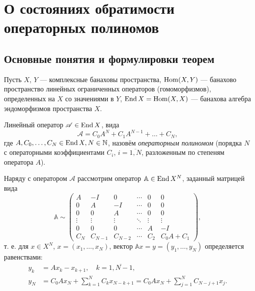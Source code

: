 \intro

\chapter{О состояниях обратимости операторных полиномов}
\section{Основные понятия и формулировки теорем}
Пусть $X$, $Y$ --- комплексные банаховы пространства, $\operatorname{Hom}(X, Y)$ --- банахово пространство линейных ограниченных операторов (гомоморфизмов), определенных на $X$ со значениями в $Y$, $\operatorname{End} X = \operatorname{Hom}(X, X)$ --- банахова алгебра эндоморфизмов пространства $X$.

Линейный оператор $ \mathcal A \in \operatorname{End} X$, вида
\[  \mathcal A = C_0 A^N + C_1 A^{N - 1} + \dotsc + C_N, \]
где $A, C_0, \dotsc, C_N \in \operatorname{End} X, N \in \mathbb{N}$, назовём \emph{операторным полиномом} (порядка $N$ с операторными коэффициентами $C_i$, $i = \overline{1,N}$, разложенным по степеням оператора $A$).

Наряду с оператором $\mathcal A$ рассмотрим оператор $\mathbb A \in \operatorname{End} X^{N}$, заданный матрицей вида
\[ \mathbb A \sim
    \begin{pmatrix}
    A & -I & 0  & \cdots & 0 & 0 \\
    0 & A  & -I & \cdots & 0 & 0 \\
    0 & 0  & A & \cdots & 0 & 0 \\
    \vdots & \vdots & \vdots & \ddots & \vdots & \vdots \\
    0 & 0 & 0 & \cdots & A & -I \\
    C_N & C_{N-1} & C_{N-2} & \cdots & C_2 & C_0 A + C_1
   \end{pmatrix}, \]
т. е. для $x \in X^{N}$, $x = (x_1, \dotsc, x_{N})$, вектор $\mathbb A x = y = (y_1, \dotsc, y_{N})$ определяется равенствами:
\begin{align*}
    y_k &= Ax_k - x_{k + 1}, \quad k = \overline{1,N-1}, \\
    y_{N} &= C_0 A x_N + \sum_{k = 1}^{N} C_k x_{N - k + 1} = C_0 A x_N + \sum_{j = 1}^{N} C_{N - j + 1} x_{j}.
\end{align*}

